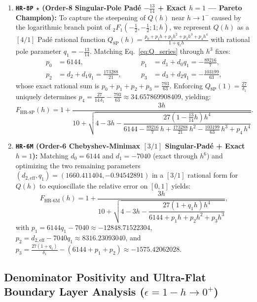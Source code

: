\documentclass[11pt,a4paper]{article}
\theoremstyle{spacious}
\theoremstyle{spaciousdef}
\begin{document}
\begin{enumerate}
    \item \textbf{\texttt{HR-8P} $\star$ (Order-8 Singular-Pole Pad\'e $-\tfrac{13}{14}$ + Exact $h=1$ --- Pareto Champion):}
    To capture the steepening of $Q(h)$ near $h \to 1^-$ caused by the logarithmic branch point of ${}_2F_1\!\left(-\tfrac{1}{2}, -\tfrac{1}{2}; 1; h\right)$, we represent $Q(h)$ as a $[4/1]$ Pad\'e rational function $Q_{\text{8P}}(h) = \frac{p_0 + p_1 h + p_2 h^2 + p_3 h^3 + p_4 h^4}{1 + q_1 h}$ with rational pole parameter $q_1 = -\frac{13}{14}$. Matching Eq.~\eqref{eq:Q_series} through $h^3$ fixes:
    \begin{equation}\label{eq:hr8p_coeffs}
    \begin{aligned}
    p_0 &= 6144, &\qquad p_1 &= d_1 + d_0 q_1 = -\frac{89216}{7}, \\
    p_2 &= d_2 + d_1 q_1 = \frac{173288}{21}, &\qquad p_3 &= d_3 + d_2 q_1 = -\frac{103199}{63},
    \end{aligned}
    \end{equation}
    whose exact rational sum is $p_0 + p_1 + p_2 + p_3 = \frac{793}{63}$. Enforcing $Q_{\text{8P}}(1) = \frac{27}{\delta_1}$ uniquely determines $p_4 = \frac{27}{14\,\delta_1} - \frac{793}{63} \approx 34.657869908409$, yielding:
    \begin{equation}\label{eq:hr8p}
    F_{\text{HR-8P}}(h) = 1 + \frac{3h}{10 + \sqrt{4 - 3h - \dfrac{27\left(1 - \frac{13}{14}h\right)h^4}{6144 - \frac{89216}{7}\,h + \frac{173288}{21}\,h^2 - \frac{103199}{63}\,h^3 + p_4\,h^4}}}.
    \end{equation}

    \item \textbf{\texttt{HR-6M} (Order-6 Chebyshev-Minimax $[3/1]$ Singular-Pad\'e + Exact $h=1$):}
    Matching $d_0 = 6144$ and $d_1 = -7040$ (exact through $h^6$) and optimizing the two remaining parameters $(d_{2,\text{eff}}, q_1) = (1660.411404, -0.94542891)$ in a $[3/1]$ rational form for $Q(h)$ to equioscillate the relative error on $[0, 1]$ yields:
    \begin{equation}\label{eq:hr6m}
    F_{\text{HR-6M}}(h) = 1 + \frac{3h}{10 + \sqrt{4 - 3h - \dfrac{27(1 + q_1 h)h^4}{6144 + p_1 h + p_2 h^2 + p_3 h^3}}},
    \end{equation}
    with $p_1 = 6144 q_1 - 7040 \approx -12848.71522304$, $p_2 = d_{2,\text{eff}} - 7040 q_1 \approx 8316.23093040$, and $p_3 = \frac{27(1+q_1)}{\delta_1} - (6144 + p_1 + p_2) \approx -1575.42062028$.
\end{enumerate}

\subsection{Denominator Positivity and Ultra-Flat Boundary Layer Analysis ($\epsilon = 1 - h \to 0^+$)}
\end{document}
